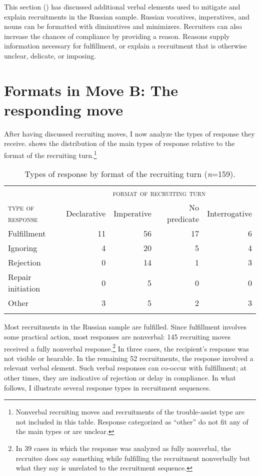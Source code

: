\documentclass[output=paper,modfonts,nonflat]{langsci/langscibook}
\begin{document}
\noindent
This section () has discussed additional verbal elements used to mitigate and explain recruitments in the Russian sample. Russian vocatives, imperatives, and nouns can be formatted with diminutives and minimizers. Recruiters can also increase the chances of compliance by providing a reason. Reasons supply information necessary for fulfillment, or explain a recruitment that is otherwise unclear, delicate, or imposing.

\section{Formats in Move B: The responding move}
\largerpage
After having discussed recruiting moves, I now analyze the types of response they receive.  shows the distribution of the main types of response relative to the format of the recruiting turn.\footnote{Nonverbal recruiting moves and recruitments of the trouble-assist type are not included in this table. Response categorized as “other” do not fit any of the main types or are unclear.} 

\begin{table}
\begin{tabularx}{\textwidth}{Xrrrr}
\lsptoprule
& \multicolumn{4}{c}{\textsc{format of recruiting turn}} \\
\textsc{type of response} & Declarative & Imperative & No predicate & Interrogative\\
\midrule
Fulfillment & 11 & 56 & 17 & 6\\
Ignoring & 4 & 20 & 5 & 4\\
Rejection & 0 & 14 & 1 & 3\\
Repair initiation & 0 & 5 & 0 & 0\\
Other & 3 & 5 & 2 & 3\\
\lspbottomrule
\end{tabularx}
\caption{Types of response by format of the recruiting turn (\textit{n}=159).}
\label{tab:baranova:4}
\end{table}

Most recruitments in the Russian sample are fulfilled. Since fulfillment involves some practical action, most responses are nonverbal: 145 recruiting moves received a fully nonverbal response.\footnote{In 39 cases in which the response was analyzed as fully nonverbal, the recruitee does say something while fulfilling the recruitment nonverbally but what they say is unrelated to the recruitment sequence.} In three cases, the recipient’s response was not visible or hearable. In the remaining 52 recruitments, the response involved a relevant verbal element. Such verbal responses can co-occur with fulfillment; at other times, they are indicative of rejection or delay in compliance. In what follows, I illustrate several response types in recruitment sequences.
\end{document}
